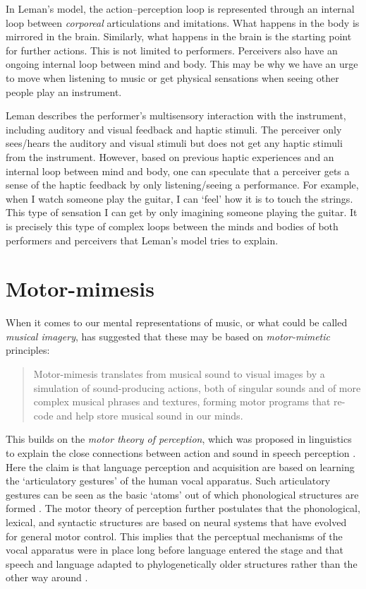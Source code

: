In Leman's model, the action--perception loop is represented through an internal loop between \emph{corporeal} articulations and imitations. What happens in the body is mirrored in the brain. Similarly,  what happens in the brain is the starting point for further actions.
This is not limited to performers. Perceivers also have an ongoing internal loop between mind and body. This may be why we have an urge to move when listening to music or get physical sensations when seeing other people play an instrument.

Leman describes the performer's multisensory interaction with the instrument, including auditory and visual feedback and haptic stimuli. The perceiver only sees/hears the auditory and visual stimuli but does not get any haptic stimuli from the instrument. However, based on previous haptic experiences and an internal loop between mind and body, one can speculate that a perceiver gets a sense of the haptic feedback by only listening/seeing a performance. For example, when I watch someone play the guitar, I can `feel' how it is to touch the strings. This type of sensation I can get by only imagining someone playing the guitar. It is precisely this type of complex loops between the minds and bodies of both performers and perceivers that Leman's model tries to explain.


\section{Motor-mimesis}

When it comes to our mental representations of music, or what could be called \emph{musical imagery}, \citet[p.318]{godoy_motor-mimetic_2003} has suggested that these may be based on \emph{motor-mimetic} principles:

\begin{quotation}
Motor-mimesis translates from musical sound to visual images by a simulation of sound-producing actions, both of singular sounds and of more complex musical phrases and textures, forming motor programs that re-code and help store musical sound in our minds.
\end{quotation}

This builds on the \emph{motor theory of perception}, which was proposed in linguistics to explain the close connections between action and sound in speech perception  \citep{liberman_motor_1985}. Here the claim is that language perception and acquisition are based on learning the `articulatory gestures' of the human vocal apparatus. Such articulatory gestures can be seen as the basic `atoms' out of which phonological structures are formed \citep{browman_articulatory_1989}. The motor theory of perception further postulates that the phonological, lexical, and syntactic structures are based on neural systems that have evolved for general motor control. This implies that the perceptual mechanisms of the vocal apparatus were in place long before language entered the stage and that speech and language adapted to phylogenetically older structures rather than the other way around \citep{lindblom_status_1991}.

